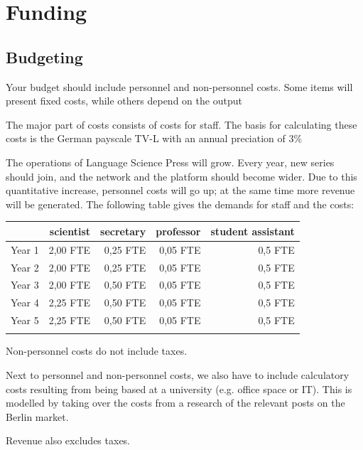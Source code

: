 \documentclass[output=guidelines,nonflat,smallfont,
draftmode
]{langsci/langscibook}
\newcommand{\background}[1]{ 
  \vspace{5mm}
  \renewcommand{\tblslinecolour}{lsDarkBlue}
  \tblssy[red]{explore2}{Background}{\vspace*{-5mm}#1}
}
\newcommand{\langscisolution}[1]{
  \renewcommand{\tblslinecolour}{lsLightBlue}
  \tblssy{langsci}{LangSci solution}{\vspace*{-5mm}#1}
}
\renewcommand{\tblssy}[4][black!12]{%
  \renewcommand{\langscisymbol}{#2}\renewcommand{\tblsboxcolor}{#1}
  \begin{mdframed}[style=yellowexercise,frametitle={#3}]
    #4
  \end{mdframed}
}
\begin{document}
\chapter{Funding}

\section{Budgeting}

\background{Your budget should include personnel and non-personnel costs. Some items will present fixed costs, while others depend on the output}
\langscisolution{
The major part of costs consists of costs for staff. The basis for calculating these costs is the German payscale TV-L with an annual preciation of 3\%

The operations of Language Science Press will grow. Every year, new series should join, and the network and the platform should become wider. Due to this quantitative increase, personnel costs will go up; at the same time more revenue will be generated. The following table gives the demands for staff and the costs: 

\todo[inline]{costs missing}
\noindent
\begin{tabularx}{\textwidth}{Xrrrr}
\lsptoprule
         &  scientist  & secretary &   professor &   student assistant  \\
\midrule
Year 1 &  2,00 FTE                 &    0,25 FTE                       &   0,05 FTE    &   0,5 FTE                  \\
Year 2 &  2,00 FTE                 &    0,25 FTE                       &   0,05 FTE    &   0,5 FTE                  \\
Year 3 &  2,00 FTE                 &    0,50 FTE                        &   0,05 FTE    &   0,5 FTE                  \\
Year 4 &  2,25 FTE              &    0,50 FTE                        &   0,05 FTE    &   0,5 FTE                  \\
Year 5 &  2,25 FTE              &    0,50 FTE                        &   0,05 FTE    &   0,5 FTE                  \\
\lspbottomrule
\end{tabularx}

Non-personnel costs do not include taxes. 

Next to personnel and non-personnel costs, we also have to include calculatory costs resulting from being based at a university (e.g. office space or IT). This is modelled by taking over the costs from a research of the relevant posts on the Berlin market. 

Revenue also excludes taxes. 
}
\end{document}
